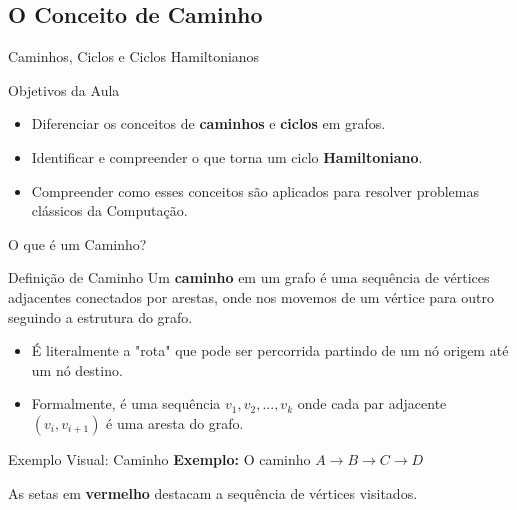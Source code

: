 \documentclass[9pt]{beamer}
\begin{document}
\subsection{O Conceito de Caminho}
\begin{frame}{Caminhos, Ciclos e Ciclos Hamiltonianos}
    \begin{block}{Objetivos da Aula}
        \begin{itemize}
            \item Diferenciar os conceitos de \textbf{caminhos} e \textbf{ciclos} em grafos.
            \item Identificar e compreender o que torna um ciclo \textbf{Hamiltoniano}.
            \item Compreender como esses conceitos são aplicados para resolver problemas clássicos da Computação.
        \end{itemize}
    \end{block}
\end{frame}

\begin{frame}{O que é um Caminho?}
    \begin{block}{Definição de Caminho}
        Um \textbf{caminho} em um grafo é uma sequência de vértices adjacentes conectados por arestas, onde nos movemos de um vértice para outro seguindo a estrutura do grafo.
    \end{block}
    \vspace{0.5cm}
    \begin{itemize}
        \item É literalmente a "rota" que pode ser percorrida partindo de um nó origem até um nó destino.
        \item Formalmente, é uma sequência $v_1, v_2, ..., v_k$ onde cada par adjacente $(v_i, v_{i+1})$ é uma aresta do grafo.
    \end{itemize}
\end{frame}

\begin{frame}{Exemplo Visual: Caminho}
    \textbf{Exemplo:} O caminho $A \rightarrow B \rightarrow C \rightarrow D$
    \vspace{0.5cm}
    \begin{center}
    \end{center}
    \vspace{0.3cm}
    As setas em \textbf{vermelho} destacam a sequência de vértices visitados.
\end{frame}
\end{document}
